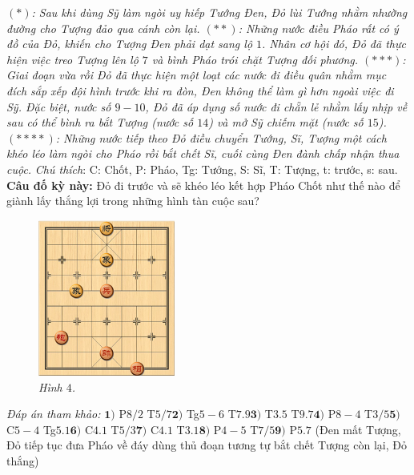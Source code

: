 \begin{multicols}{2}
	\vskip 0.1cm
	\textit{$(*)$: Sau khi dùng Sỹ làm ngòi uy hiếp Tướng Đen, Đỏ lùi Tướng nhằm nhường đường cho Tượng đảo qua cánh còn lại.
	\vskip 0.1cm
	$(**)$: Những nước điều Pháo rất có ý đồ của Đỏ, khiến cho Tượng Đen phải dạt sang lộ $1$. Nhân cơ hội đó, Đỏ đã thực hiện việc treo Tượng lên lộ $7$ và bình Pháo trói chặt Tượng đối phương.
	\vskip 0.1cm
	$(***)$: Giai đoạn vừa rồi Đỏ đã thực hiện một loạt các nước đi điều quân nhằm mục đích sắp xếp đội hình trước khi ra đòn, Đen không thể làm gì hơn ngoài việc đi Sỹ. Đặc biệt, nước số $9-10$, Đỏ đã áp dụng số nước đi chẵn lẻ nhằm lấy nhịp về sau có thể bình ra bắt Tượng (nước số $14$) và mở Sỹ chiếm mặt (nước số $15$).
	\vskip 0.1cm
	$(****)$: Những nước tiếp theo Đỏ điều chuyển Tướng, Sĩ, Tượng một cách khéo léo làm ngòi cho Pháo rồi bắt chết Sĩ, cuối cùng Đen đành chấp nhận thua cuộc.}
	\vskip 0.1cm
	\textit{Chú thích}: C: Chốt, P: Pháo, Tg: Tướng, S: Sĩ, T: Tượng, t: trước, s: sau.
	\vskip 0.1cm
	\textbf{\color{gocco}Câu đố kỳ này:} Đỏ đi trước và sẽ khéo léo kết hợp Pháo Chốt như thế nào để giành lấy thắng lợi trong những hình tàn cuộc sau?
	\begin{figure}[H]
		\vspace*{5pt}
		\centering
		\captionsetup{labelformat= empty, justification=centering}
		\includegraphics[width= 0.4\textwidth]{4}
		\caption{\small\textit{\color{gocco}Hình $4$.}}
		\vspace*{-10pt}
	\end{figure}
	\textit{Đáp án tham khảo:} $\pmb{1)}$ P$8/2$ T$5/7$\quad  $\pmb{2)}$ Tg$5-6$ T$7.9$\quad $\pmb{3)}$ T$3.5$ T$9.7$\quad $\pmb{4)}$ P$8-4$ T$3/5$\quad $\pmb{5)}$ C$5-4$ Tg$5.1$\quad $\pmb{6)}$ C$4.1$ T$5/3$\quad $\pmb{7)}$ C$4.1$ T$3.1$\quad $\pmb{8)}$ P$4-5$ T$7/5$\quad $\pmb{9)}$ P$5.7$ (Đen mất Tượng, Đỏ tiếp tục đưa Pháo về đáy dùng thủ đoạn tương tự bắt chết Tượng còn lại, Đỏ thắng)
	\begin{figure}[H]
		\vspace*{-5pt}

\end{figure}
\end{multicols}
